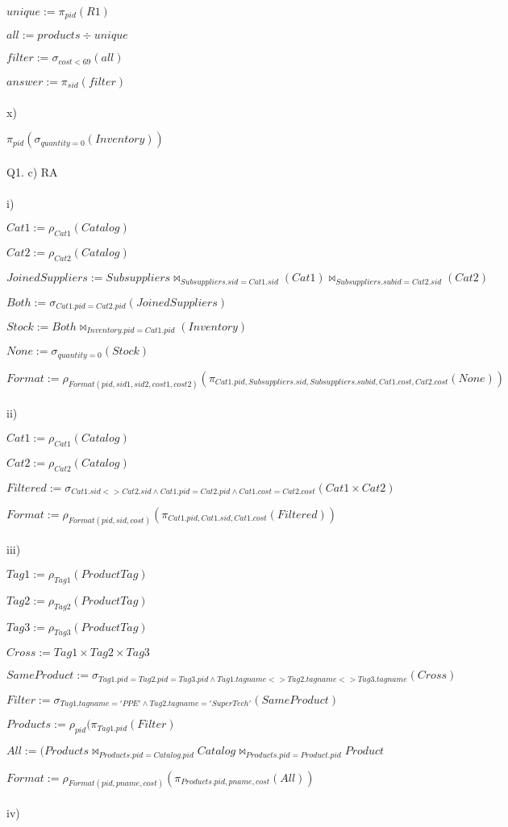 \documentclass[10pt]{article}
\begin{document}
$unique := \pi_{pid}(R1)$

$all := products \div unique$

$filter := \sigma_{cost<69}(all)$

$answer := \pi_{sid}(filter)$
\\~\\
x)

$\pi_{pid}(\sigma_{quantity=0}(Inventory))$
\\~\\
Q1. c) RA
\\~\\
i)

$Cat1 := \rho_{Cat1}(Catalog)$

$Cat2 := \rho_{Cat2}(Catalog)$

$JoinedSuppliers := Subsuppliers \bowtie_{Subsuppliers.sid = Cat1.sid}(Cat1) \bowtie_{Subsuppliers.subid = Cat2.sid}(Cat2)$

$Both := \sigma_{Cat1.pid = Cat2.pid}(JoinedSuppliers)$

$Stock := Both \bowtie_{Inventory.pid =  Cat1.pid}(Inventory)$

$None := \sigma_{quantity = 0}(Stock)$

$Format := \rho_{Format(pid, sid1, sid2, cost1, cost2)}(\pi_{Cat1.pid, Subsuppliers.sid, Subsuppliers.subid, Cat1.cost, Cat2.cost}(None))$
\\~\\
ii)

$Cat1 := \rho_{Cat1}(Catalog)$

$Cat2 := \rho_{Cat2}(Catalog)$

$Filtered := \sigma_{Cat1.sid <> Cat2.sid \wedge Cat1.pid = Cat2.pid \wedge Cat1.cost = Cat2.cost}(Cat1 \times Cat2)$

$Format := \rho_{Format(pid, sid, cost)}(\pi_{Cat1.pid, Cat1.sid, Cat1.cost}(Filtered))$
\\~\\
iii)

$Tag1 := \rho_{Tag1}(ProductTag)$

$Tag2 := \rho_{Tag2}(ProductTag)$

$Tag3 := \rho_{Tag3}(ProductTag)$

$Cross := Tag1 \times Tag2 \times Tag3$

$SameProduct := \sigma_{Tag1.pid = Tag2.pid = Tag3.pid \wedge Tag1.tagname <> Tag2.tagname <> Tag3.tagname}(Cross)$

$Filter := \sigma_{Tag1.tagname = 'PPE' \wedge Tag2.tagname ='Super Tech'}(SameProduct)$

$Products := \rho_{pid}(\pi_{Tag1.pid}(Filter)$

$All := (Products \bowtie_{Products.pid = Catalog.pid} Catalog \bowtie_{Products.pid = Product.pid} Product$

$Format := \rho_{Format(pid, pname, cost)}(\pi_{Products.pid, pname, cost}(All))$
\\~\\
iv)
\end{document}
